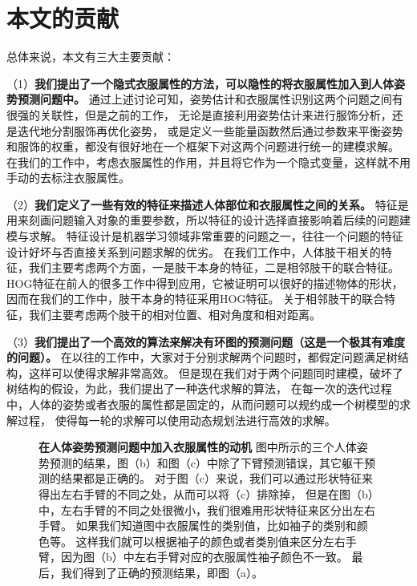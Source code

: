 \section{本文的贡献}
总体来说，本文有三大主要贡献：

（1）\textbf{我们提出了一个隐式衣服属性的方法，可以隐性的将衣服属性加入到人体姿势预测问题中。}
通过上述讨论可知，姿势估计和衣服属性识别这两个问题之间有很强的关联性，但是之前的工作，
无论是直接利用姿势估计来进行服饰分析，还是迭代地分割服饰再优化姿势，
或是定义一些能量函数然后通过参数来平衡姿势和服饰的权重，都没有很好地在一个框架下对这两个问题进行统一的建模求解。
在我们的工作中，考虑衣服属性的作用，并且将它作为一个隐式变量，这样就不用手动的去标注衣服属性。

（2）\textbf{我们定义了一些有效的特征来描述人体部位和衣服属性之间的关系。}
特征是用来刻画问题输入对象的重要参数，所以特征的设计选择直接影响着后续的问题建模与求解。 特征设计是机器学习领域非常重要的问题之一，往往一个问题的特征设计好坏与否直接关系到问题求解的优劣。
在我们工作中，人体肢干相关的特征，我们主要考虑两个方面，一是肢干本身的特征，二是相邻肢干的联合特征。 HOG特征在前人的很多工作中得到应用，它被证明可以很好的描述物体的形状，因而在我们的工作中，肢干本身的特征采用HOG特征。 关于相邻肢干的联合特征，我们主要考虑两个肢干的相对位置、相对角度和相对距离。


（3）\textbf{我们提出了一个高效的算法来解决有环图的预测问题（这是一个极其有难度的问题）。}
在以往的工作中，大家对于分别求解两个问题时，都假定问题满足树结构，这样可以使得求解非常高效。 但是现在我们对于两个问题同时建模，破坏了树结构的假设，为此，我们提出了一种迭代求解的算法， 在每一次的迭代过程中，人体的姿势或者衣服的属性都是固定的，从而问题可以规约成一个树模型的求解过程， 使得每一轮的求解可以使用动态规划法进行高效的求解。

\begin{figure}[tbp]
    \centering
    \caption{
    \textbf{在人体姿势预测问题中加入衣服属性的动机}
图中所示的三个人体姿势预测的结果，图（b）和图（c）中除了下臂预测错误，其它躯干预测的结果都是正确的。
对于图（c）来说，我们可以通过形状特征来得出左右手臂的不同之处，从而可以将（c）排除掉，
但是在图（b）中，左右手臂的不同之处很微小，我们很难用形状特征来区分出左右手臂。
如果我们知道图中衣服属性的类别值，比如袖子的类别和颜色等。
这样我们就可以根据袖子的颜色或者类别值来区分左右手臂，因为图（b）中左右手臂对应的衣服属性袖子颜色不一致。
最后，我们得到了正确的预测结果，即图（a）。
    }
    \label{fig:eg}
\end{figure}


